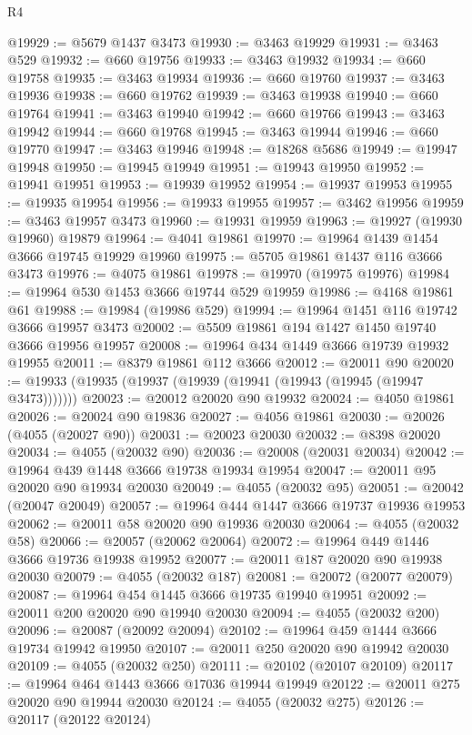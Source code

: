 \begin{lexlean}{R4}
\begin{coremodule}
@19929 := @5679 @1437 @3473
@19930 := @3463 @19929
@19931 := @3463 @529
@19932 := @660 @19756
@19933 := @3463 @19932
@19934 := @660 @19758
@19935 := @3463 @19934
@19936 := @660 @19760
@19937 := @3463 @19936
@19938 := @660 @19762
@19939 := @3463 @19938
@19940 := @660 @19764
@19941 := @3463 @19940
@19942 := @660 @19766
@19943 := @3463 @19942
@19944 := @660 @19768
@19945 := @3463 @19944
@19946 := @660 @19770
@19947 := @3463 @19946
@19948 := @18268 @5686
@19949 := @19947 @19948
@19950 := @19945 @19949
@19951 := @19943 @19950
@19952 := @19941 @19951
@19953 := @19939 @19952
@19954 := @19937 @19953
@19955 := @19935 @19954
@19956 := @19933 @19955
@19957 := @3462 @19956
@19959 := @3463 @19957 @3473
@19960 := @19931 @19959
@19963 := @19927 (@19930 @19960) @19879
@19964 := @4041 @19861
@19970 := @19964 @1439 @1454 @3666 @19745 @19929 @19960
@19975 := @5705 @19861 @1437 @116 @3666 @3473
@19976 := @4075 @19861
@19978 := @19970 (@19975 @19976)
@19984 := @19964 @530 @1453 @3666 @19744 @529 @19959
@19986 := @4168 @19861 @61
@19988 := @19984 (@19986 @529)
@19994 := @19964 @1451 @116 @19742 @3666 @19957 @3473
@20002 := @5509 @19861 @194 @1427 @1450 @19740 @3666 @19956 @19957
@20008 := @19964 @434 @1449 @3666 @19739 @19932 @19955
@20011 := @8379 @19861 @112 @3666
@20012 := @20011 @90
@20020 := @19933 (@19935 (@19937 (@19939 (@19941 (@19943 (@19945 (@19947 @3473)))))))
@20023 := @20012 @20020 @90 @19932
@20024 := @4050 @19861
@20026 := @20024 @90 @19836
@20027 := @4056 @19861
@20030 := @20026 (@4055 (@20027 @90))
@20031 := @20023 @20030
@20032 := @8398 @20020
@20034 := @4055 (@20032 @90)
@20036 := @20008 (@20031 @20034)
@20042 := @19964 @439 @1448 @3666 @19738 @19934 @19954
@20047 := @20011 @95 @20020 @90 @19934 @20030
@20049 := @4055 (@20032 @95)
@20051 := @20042 (@20047 @20049)
@20057 := @19964 @444 @1447 @3666 @19737 @19936 @19953
@20062 := @20011 @58 @20020 @90 @19936 @20030
@20064 := @4055 (@20032 @58)
@20066 := @20057 (@20062 @20064)
@20072 := @19964 @449 @1446 @3666 @19736 @19938 @19952
@20077 := @20011 @187 @20020 @90 @19938 @20030
@20079 := @4055 (@20032 @187)
@20081 := @20072 (@20077 @20079)
@20087 := @19964 @454 @1445 @3666 @19735 @19940 @19951
@20092 := @20011 @200 @20020 @90 @19940 @20030
@20094 := @4055 (@20032 @200)
@20096 := @20087 (@20092 @20094)
@20102 := @19964 @459 @1444 @3666 @19734 @19942 @19950
@20107 := @20011 @250 @20020 @90 @19942 @20030
@20109 := @4055 (@20032 @250)
@20111 := @20102 (@20107 @20109)
@20117 := @19964 @464 @1443 @3666 @17036 @19944 @19949
@20122 := @20011 @275 @20020 @90 @19944 @20030
@20124 := @4055 (@20032 @275)
@20126 := @20117 (@20122 @20124)

\end{coremodule}
\end{lexlean}
